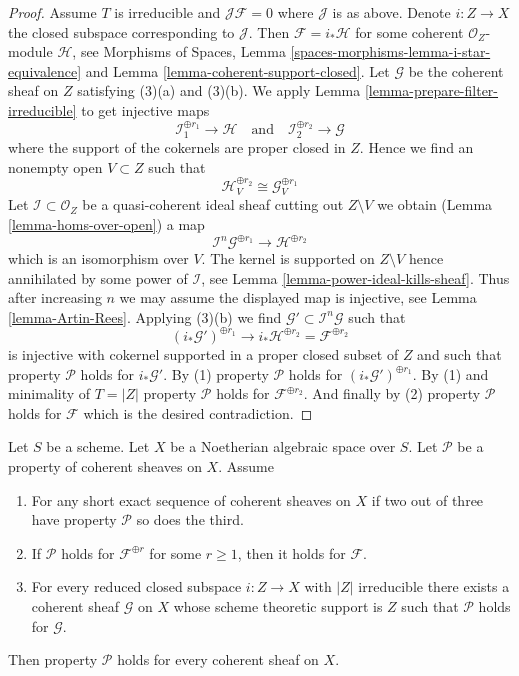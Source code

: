 \begin{proof}
\medskip\noindent
Assume $T$ is irreducible and $\mathcal{J}\mathcal{F} = 0$ where
$\mathcal{J}$ is as above. Denote $i : Z \to X$ the closed subspace
corresponding to $\mathcal{J}$. Then $\mathcal{F} = i_*\mathcal{H}$
for some coherent $\mathcal{O}_Z$-module $\mathcal{H}$, see
Morphisms of Spaces, Lemma \ref{spaces-morphisms-lemma-i-star-equivalence}
and Lemma \ref{lemma-coherent-support-closed}.
Let $\mathcal{G}$ be the coherent sheaf on $Z$ satisfying
(3)(a) and (3)(b). We apply Lemma \ref{lemma-prepare-filter-irreducible}
to get injective maps
$$
\mathcal{I}_1^{\oplus r_1} \to \mathcal{H}
\quad\text{and}\quad
\mathcal{I}_2^{\oplus r_2} \to \mathcal{G}
$$
where the support of the cokernels are proper closed in $Z$. Hence we find
an nonempty open $V \subset Z$ such that
$$
\mathcal{H}^{\oplus r_2}_V \cong \mathcal{G}^{\oplus r_1}_V
$$
Let $\mathcal{I} \subset \mathcal{O}_Z$ be a quasi-coherent ideal sheaf
cutting out $Z \setminus V$ we obtain
(Lemma \ref{lemma-homs-over-open})
a map
$$
\mathcal{I}^n\mathcal{G}^{\oplus r_1} \longrightarrow \mathcal{H}^{\oplus r_2}
$$
which is an isomorphism over $V$. The kernel is supported on $Z \setminus V$
hence annihilated by some power of $\mathcal{I}$, see
Lemma \ref{lemma-power-ideal-kills-sheaf}. Thus after increasing
$n$ we may assume the displayed map is injective, see
Lemma \ref{lemma-Artin-Rees}. Applying (3)(b) we find
$\mathcal{G}' \subset \mathcal{I}^n\mathcal{G}$ such that
$$
(i_*\mathcal{G}')^{\oplus r_1} \longrightarrow
i_*\mathcal{H}^{\oplus r_2} = \mathcal{F}^{\oplus r_2}
$$
is injective with cokernel supported in a proper closed subset of $Z$
and such that property $\mathcal{P}$ holds for $i_*\mathcal{G}'$.
By (1) property $\mathcal{P}$ holds for $(i_*\mathcal{G}')^{\oplus r_1}$.
By (1) and minimality of $T = |Z|$ property $\mathcal{P}$ holds for
$\mathcal{F}^{\oplus r_2}$. And finally by (2) property $\mathcal{P}$
holds for $\mathcal{F}$ which is the desired contradiction.
\end{proof}

\begin{lemma}
\label{lemma-property-higher-rank-cohomological-variant}
Let $S$ be a scheme. Let $X$ be a Noetherian algebraic space over $S$.
Let $\mathcal{P}$ be a property of coherent sheaves on $X$. Assume
\begin{enumerate}
\item For any short exact sequence of coherent sheaves on $X$
if two out of three have property $\mathcal{P}$ so does the third.
\item If $\mathcal{P}$ holds  for $\mathcal{F}^{\oplus r}$ for
some $r \geq 1$, then it holds for $\mathcal{F}$.
\item For every reduced closed subspace $i : Z \to X$ with
$|Z|$ irreducible there exists a coherent sheaf $\mathcal{G}$ on $X$
whose scheme theoretic support is $Z$ such that $\mathcal{P}$ holds for
$\mathcal{G}$.
\end{enumerate}
Then property $\mathcal{P}$ holds for every coherent sheaf on $X$.
\end{lemma}

